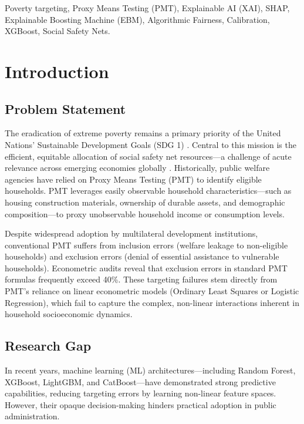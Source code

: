 \documentclass[conference]{IEEEtran}
\begin{document}
\begin{IEEEkeywords}
Poverty targeting, Proxy Means Testing (PMT), Explainable AI (XAI), SHAP, Explainable Boosting Machine (EBM), Algorithmic Fairness, Calibration, XGBoost, Social Safety Nets.
\end{IEEEkeywords}

\section{Introduction}

\subsection{Problem Statement}
The eradication of extreme poverty remains a primary priority of the United Nations' Sustainable Development Goals (SDG 1) \cite{b1}. Central to this mission is the efficient, equitable allocation of social safety net resources—a challenge of acute relevance across emerging economies globally \cite{b2, b3}. Historically, public welfare agencies have relied on Proxy Means Testing (PMT) \cite{b4} to identify eligible households. PMT leverages easily observable household characteristics—such as housing construction materials, ownership of durable assets, and demographic composition—to proxy unobservable household income or consumption levels.

Despite widespread adoption by multilateral development institutions, conventional PMT suffers from inclusion errors (welfare leakage to non-eligible households) and exclusion errors (denial of essential assistance to vulnerable households). Econometric audits reveal that exclusion errors in standard PMT formulas frequently exceed 40\%. These targeting failures stem directly from PMT's reliance on linear econometric models (Ordinary Least Squares or Logistic Regression), which fail to capture the complex, non-linear interactions inherent in household socioeconomic dynamics.

\subsection{Research Gap}
In recent years, machine learning (ML) architectures—including Random Forest, XGBoost, LightGBM, and CatBoost—have demonstrated strong predictive capabilities, reducing targeting errors by learning non-linear feature spaces. However, their opaque decision-making hinders practical adoption in public administration.
\end{document}
